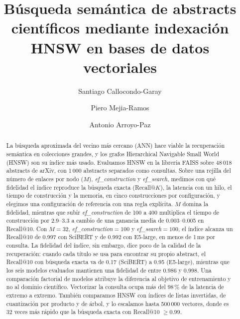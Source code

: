 \documentclass[runningheads]{llncs}
\newcommand{\efc}{\textit{ef\_construction}}
\newcommand{\efs}{\textit{ef\_search}}
\begin{document}
\title{Búsqueda semántica de abstracts científicos mediante
indexación HNSW en bases de datos vectoriales}

\author{Santiago Callocondo-Garay \and
Piero Mejia-Ramos \and
Antonio Arroyo-Paz}



\maketitle

\begin{abstract}
La búsqueda aproximada del vecino más cercano (ANN) hace viable la recuperación semántica
en colecciones grandes, y los grafos Hierarchical Navigable Small World (HNSW) son su índice
más usado. Evaluamos HNSW en la librería FAISS sobre 48\,018 abstracts de arXiv, con 1\,000
abstracts separados como consultas. Sobre una rejilla del número de enlaces por nodo ($M$),
\efc{} y \efs{}, medimos con qué fidelidad el índice reproduce la búsqueda exacta
(Recall@$K$), la latencia con un hilo, el tiempo de construcción y la memoria, en cinco
construcciones por configuración, y elegimos una configuración de referencia con una regla
explícita. $M$ domina la fidelidad, mientras que subir \efc{} de 100 a 400 multiplica el
tiempo de construcción por 2.9--3.3 a cambio de una ganancia media de 0.003--0.005 en
Recall@10. Con $M=32$, \efc{}$=100$ y \efs{}$=100$, el índice alcanza un Recall@10 de 0.997
con SciBERT y de 0.992 con E5-large, en menos de 1\,ms por consulta. La fidelidad del índice,
sin embargo, dice poco de la calidad de la recuperación: cuando cada título se usa para
encontrar su propio abstract, el Recall@10 con búsqueda exacta va de 0.17 (SciBERT) a 0.95
(E5-large),
mientras que los seis modelos evaluados mantienen una fidelidad de entre 0.986 y 0.998. Una
comparación factorial de modelos atribuye la diferencia al objetivo de entrenamiento y no al
dominio científico. Vectorizar la consulta ocupa más del 98\,\% de la latencia de extremo a
extremo. También comparamos HNSW con índices de listas invertidas, de cuantización por
producto y de árbol, y lo escalamos hasta 500\,000 vectores, donde es 32 veces más rápido que
la búsqueda exacta con Recall@10 $\geq 0.99$.

\end{abstract}
\end{document}
